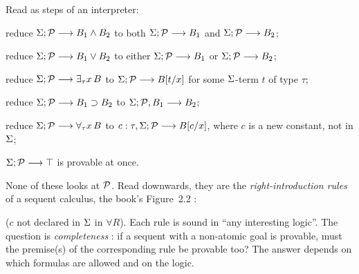 \begin{definition}\label{def:horn-reduction}
Read as steps of an interpreter:
\begin{description}[font=\normalfont\scshape]
  \item[and] reduce $\Sigma;\mathcal{P}\longrightarrow B_1\wedge B_2$ to both $\Sigma;\mathcal{P}\longrightarrow B_1$ and $\Sigma;\mathcal{P}\longrightarrow B_2$;
  \item[or] reduce $\Sigma;\mathcal{P}\longrightarrow B_1\vee B_2$ to either $\Sigma;\mathcal{P}\longrightarrow B_1$ or $\Sigma;\mathcal{P}\longrightarrow B_2$;
  \item[instan] reduce $\Sigma;\mathcal{P}\longrightarrow\exists_\tau x\,B$ to $\Sigma;\mathcal{P}\longrightarrow B[t/x]$ for some $\Sigma$-term $t$ of type $\tau$;
  \item[augment] reduce $\Sigma;\mathcal{P}\longrightarrow B_1\supset B_2$ to $\Sigma;\mathcal{P},B_1\longrightarrow B_2$;
  \item[generic] reduce $\Sigma;\mathcal{P}\longrightarrow\forall_\tau x\,B$ to $c:\tau,\Sigma;\mathcal{P}\longrightarrow B[c/x]$, where $c$ is a new constant, not in $\Sigma$;
  \item[true] $\Sigma;\mathcal{P}\longrightarrow\top$ is provable at once.
\end{description}
\end{definition}
None of these looks at $\mathcal{P}$. Read downwards, they are the \emph{right-intro\-duction rules} of a sequent
calculus, the book's Figure~2.2 :
($c$ not declared in $\Sigma$ in $\forall R$). Each rule is sound in ``any interesting logic''. The question is
\emph{completeness} : if a sequent with a non-atomic goal is provable, must the premise(s) of the
corresponding rule be provable too? The answer depends on which formulas are allowed and on the logic.

